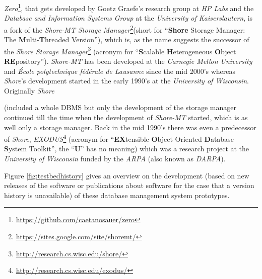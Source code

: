 	\emph{Zero}\footnote{\url{https://github.com/caetanosauer/zero}}, that gets developed by Goetz Graefe's research group at \emph{HP Labs} and the \emph{Database and Information Systems Group} at the \emph{University of Kaiserslautern}, is a fork of the \emph{Shore-MT Storage Manager}\footnote{\url{https://sites.google.com/site/shoremt/}}(short for ``\textbf{Shore} Storage Manager: The \textbf{M}ulti-\textbf{T}hreaded Version''), which is, as the name suggests the successor of the \emph{Shore Storage Manager}\footnote{\url{http://research.cs.wisc.edu/shore/}} (acronym for ``\textbf{S}calable \textbf{H}eterogeneous \textbf{O}bject \textbf{RE}pository''). \emph{Shore-MT} has been developed at the \emph{Carnegie Mellon University} and \emph{École polytechnique fédérale de Lausanne} since the mid 2000's whereas \emph{Shore}'s development started in the early 1990's at the \emph{University of Wisconsin}. Originally \emph{Shore}\addtocounter{footnote}{-1}\footnotemark (included a whole DBMS but only the development of the storage manager continued till the time when the development of \emph{Shore-MT} started, which is as well only a storage manager. Back in the mid 1990's there was even a predecessor of \emph{Shore}, \emph{EXODUS}\footnote{\url{http://research.cs.wisc.edu/exodus/}} (acronym for ``\textbf{EX}tensible \textbf{O}bject-Oriented \textbf{D}atabase \textbf{S}ystem Toolkit'', the ``\textbf{U}'' has no meaning) which was a research project at the \emph{University of Wisconsin} funded by the \emph{ARPA} (also known as \emph{DARPA}).
	
	Figure \ref{fig:testbedhistory} gives an overview on the development (based on new releases of the software or publications about software for the case that a version history is unavailable) of these database management system prototypes.
	
	
